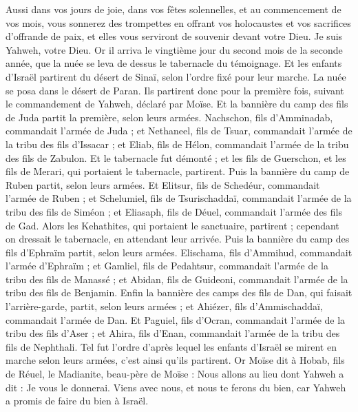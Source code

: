 \begin{multicols}{2}
Aussi dans vos jours de joie, dans vos fêtes solennelles, et au commencement de vos mois, vous sonnerez des trompettes en offrant vos holocaustes et vos sacrifices d'offrande de paix, et elles vous serviront de souvenir devant votre Dieu. Je suis Yahweh, votre Dieu.
Or il arriva le vingtième jour du second mois de la seconde année, que la nuée se leva de dessus le tabernacle du témoignage.
Et les enfants d'Israël partirent du désert de Sinaï, selon l'ordre fixé pour leur marche. La nuée se posa dans le désert de Paran.
Ils partirent donc pour la première fois, suivant le commandement de Yahweh, déclaré par Moïse.
Et la bannière du camp des fils de Juda partit la première, selon leurs armées. Nachschon, fils d'Amminadab, commandait l'armée de Juda ;
et Nethaneel, fils de Tsuar, commandait l'armée de la tribu des fils d'Issacar ;
et Eliab, fils de Hélon, commandait l'armée de la tribu des fils de Zabulon.
Et le tabernacle fut démonté ; et les fils de Guerschon, et les fils de Merari, qui portaient le tabernacle, partirent.
Puis la bannière du camp de Ruben partit, selon leurs armées. Et Elitsur, fils de Schedéur, commandait l'armée de Ruben ;
et Schelumiel, fils de Tsurischaddaï, commandait l'armée de la tribu des fils de Siméon ;
et Eliasaph, fils de Déuel, commandait l'armée des fils de Gad.
Alors les Kehathites, qui portaient le sanctuaire, partirent ; cependant on dressait le tabernacle, en attendant leur arrivée.
Puis la bannière du camp des fils d'Ephraïm partit, selon leurs armées. Elischama, fils d'Ammihud, commandait l'armée d'Ephraïm ;
et Gamliel, fils de Pedahtsur, commandait l'armée de la tribu des fils de Manassé ;
et Abidan, fils de Guideoni, commandait l'armée de la tribu des fils de Benjamin.
Enfin la bannière des camps des fils de Dan, qui faisait l'arrière-garde, partit, selon leurs armées ; et Ahiézer, fils d'Ammischaddaï, commandait l'armée de Dan.
Et Paguiel, fils d'Ocran, commandait l'armée de la tribu des fils d'Aser ;
et Ahira, fils d'Enan, commandait l'armée de la tribu des fils de Nephthali.
Tel fut l'ordre d'après lequel les enfants d'Israël se mirent en marche selon leurs armées, c'est ainsi qu'ils partirent.
Or Moïse dit à Hobab, fils de Réuel, le Madianite, beau-père de Moïse : Nous allons au lieu dont Yahweh a dit : Je vous le donnerai. Viens avec nous, et nous te ferons du bien, car Yahweh a promis de faire du bien à Israël.

\end{multicols}
